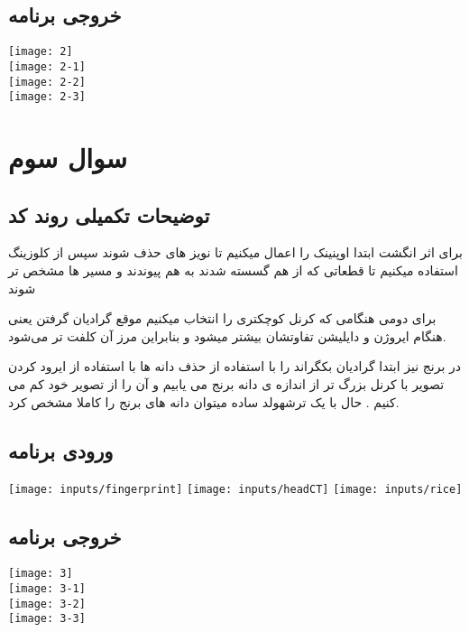 \documentclass[12pt]{article}
\begin{document}
		\subsection{خروجی برنامه}
		
		\texttt{[image: 2]}\\
		\texttt{[image: 2-1]}\\
		\texttt{[image: 2-2]}\\
		\texttt{[image: 2-3]}\\
		
		\newpage
		

\section{سوال سوم}
\subsection{توضیحات تکمیلی روند کد}
برای اثر انگشت ابتدا اوپنینک را اعمال میکنیم تا نویز های حذف شوند سپس از کلوزینگ استفاده میکنیم تا قطعاتی که از هم گسسته شدند به هم پیوندند و مسیر ها مشخص تر شوند

برای دومی هنگامی که کرنل کوچکتری را انتخاب میکنیم موقع گرادیان گرفتن یعنی هنگام ایروژن و دایلیشن تفاوتشان بیشتر میشود و بنابراین مرز آن کلفت تر می‌شود.

در برنج نیز ابتدا گرادیان بکگراند را با استفاده از حذف دانه ها با استفاده از ایرود کردن تصویر با کرنل بزرگ تر از اندازه ی دانه برنج می یابیم و آن را از تصویر خود کم می کنیم . حال با یک ترشهولد ساده میتوان دانه های برنج را کاملا مشخص کرد.


\subsection{ورودی برنامه}
\texttt{[image: inputs/fingerprint]}
\texttt{[image: inputs/headCT]}
\texttt{[image: inputs/rice]}
\subsection{خروجی برنامه}

\texttt{[image: 3]}\\
\texttt{[image: 3-1]}\\
\texttt{[image: 3-2]}\\
\texttt{[image: 3-3]}\\

\newpage
\end{document}
